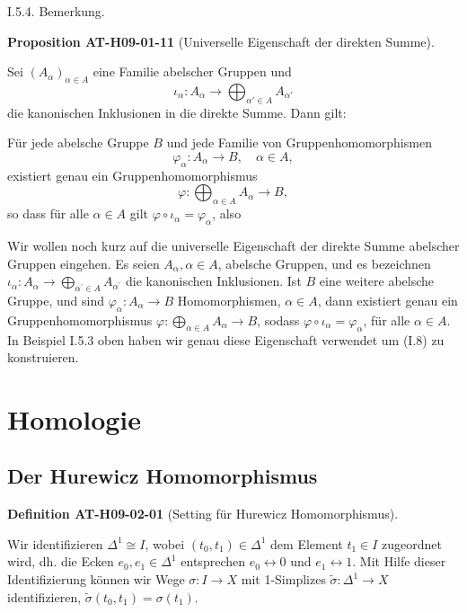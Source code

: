 \documentclass[10pt, letterpaper]{article}
\newcommand{\CustomHeading}[3]{%
  \par\medskip\noindent%
  \textbf{#1 #2} \textnormal{(#3)}.\enskip%
}
\newenvironment{DEF}[2]{\begin{unitbox}\CustomHeading{Definition}{#1}{#2}}{\end{unitbox}}
\newenvironment{PROP}[2]{\begin{unitbox}\CustomHeading{Proposition}{#1}{#2}}{\end{unitbox}}
\begin{document}
I.5.4. Bemerkung. 



\begin{PROP}{AT-H09-01-11}{Universelle Eigenschaft der direkten Summe}
Sei $(A_\alpha)_{\alpha \in A}$ eine Familie abelscher Gruppen und
\[
\iota_\alpha : A_\alpha \rightarrow \bigoplus_{\alpha' \in A} A_{\alpha'}
\]
die kanonischen Inklusionen in die direkte Summe. Dann gilt:

Für jede abelsche Gruppe $B$ und jede Familie von Gruppenhomomorphismen
\[
\varphi_\alpha : A_\alpha \rightarrow B, \quad \alpha \in A,
\]
existiert genau ein Gruppenhomomorphismus
\[
\varphi : \bigoplus_{\alpha \in A} A_\alpha \rightarrow B,
\]
so dass für alle $\alpha \in A$ gilt $\varphi \circ \iota_\alpha = \varphi_\alpha$, also
\begin{center}
\end{center}
\end{PROP}


Wir wollen noch kurz auf die universelle Eigenschaft der direkte Summe abelscher Gruppen eingehen. Es seien $A_\alpha, \alpha \in A$, abelsche Gruppen, und es bezeichnen $\iota_\alpha: A_\alpha \rightarrow \bigoplus_{\alpha^{\prime} \in A} A_{\alpha^{\prime}}$ die kanonischen Inklusionen. Ist $B$ eine weitere abelsche Gruppe, und sind $\varphi_\alpha: A_\alpha \rightarrow B$ Homomorphismen, $\alpha \in A$, dann existiert genau ein Gruppenhomomorphismus $\varphi: \bigoplus_{\alpha \in A} A_\alpha \rightarrow B$, sodass $\varphi \circ \iota_\alpha=\varphi_\alpha$, für alle $\alpha \in A$. In Beispiel I.5.3 oben haben wir genau diese Eigenschaft verwendet um (I.8) zu konstruieren.




\pagebreak

\section{Homologie}


\subsection{Der Hurewicz Homomorphismus}


\begin{DEF}{AT-H09-02-01}{Setting für Hurewicz Homomorphismus}
Wir identifizieren $\Delta^1 \cong I$, wobei $\left(t_0, t_1\right) \in \Delta^1$ dem Element $t_1 \in I$ zugeordnet wird, dh. die Ecken $e_0, e_1 \in \Delta^1$ entsprechen $e_0 \leftrightarrow 0$ und $e_1 \leftrightarrow 1$. Mit Hilfe dieser Identifizierung können wir Wege $\sigma: I \rightarrow X$ mit 1-Simplizes $\tilde{\sigma}: \Delta^1 \rightarrow X$ identifizieren, $\tilde{\sigma}\left(t_0, t_1\right)=\sigma\left(t_1\right)$.
\end{DEF}
\end{document}
